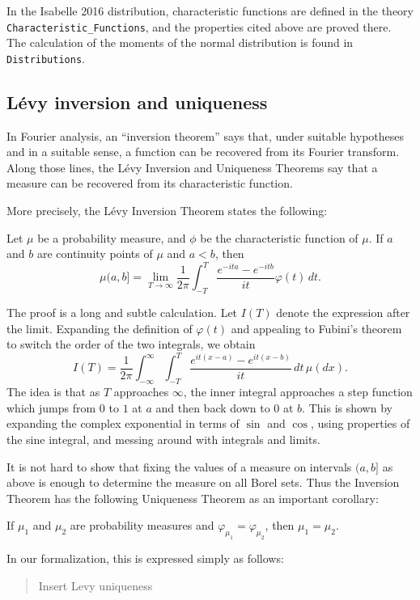 \documentclass{svjour3}
\newcommand{\todo}[1]{{\color{red}#1}}
\newcommand{\ph}{\varphi}
\begin{document}
In the Isabelle 2016 distribution, characteristic functions are defined in the theory \verb=Characteristic_Functions=, and the properties cited above are proved there. The calculation of the moments of the normal distribution is found in \verb=Distributions=.

\subsection{L\'evy inversion and uniqueness}

In Fourier analysis, an ``inversion theorem'' says that, under suitable hypotheses and in a suitable sense, a function can be recovered from its Fourier transform. Along those lines, the L\'evy Inversion and Uniqueness Theorems say that a measure can be recovered from its characteristic function. 

More precisely, the L\'evy Inversion Theorem states the following:
\begin{theorem}
Let $\mu$ be a probability measure, and $\phi$ be the characteristic function of $\mu$. If $a$ and $b$ are continuity points of $\mu$ and $a < b$, then
\[ 
\mu (a,b] = \lim_{T \rightarrow \infty} \frac{1}{2\pi} \int_{-T}^T \frac{e^{-ita} - e^{-itb}}{it} \ph(t) \, dt. 
\]
\end{theorem}

The proof is a long and subtle calculation. Let $I(T)$ denote the expression after the limit. Expanding the definition of $\ph(t)$ and appealing to Fubini's theorem to switch the order of the two integrals, we obtain
\[
I(T) = \frac{1}{2\pi} \int_{-\infty}^\infty \int_{-T}^T \frac{e^{it(x-a)} - e^{it(x-b)}}{it} \, dt \, \mu(dx). 
\]
The idea is that as $T$ approaches $\infty$, the inner integral approaches a step function which jumps from $0$ to $1$ at $a$ and then back down to $0$ at $b$. This is shown by expanding the complex exponential in terms of $\sin$ and $\cos$, using properties of the sine integral, and messing around with integrals and limits.

It is not hard to show that fixing the values of a measure on intervals $(a, b]$ as above is enough to determine the measure on all Borel sets. Thus the Inversion Theorem has the following Uniqueness Theorem as an important corollary:
\begin{theorem}
If $\mu_1$ and $\mu_2$ are probability measures and $\ph_{\mu_1} = \ph_{\mu_2}$, then $\mu_1 = \mu_2$. 
\end{theorem}
In our formalization, this is expressed simply as follows:
\begin{quote}
 \todo{Insert Levy uniqueness}
\end{quote}
\end{document}
